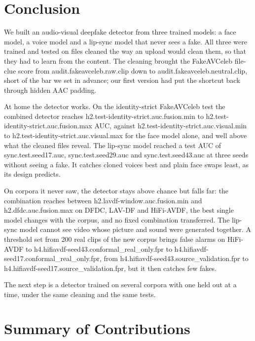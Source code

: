 \section{Conclusion}

We built an audio-visual deepfake detector from three trained models: a face
model, a voice model and a lip-sync model that never sees a fake. All three
were trained and tested on files cleaned the way an upload would clean them,
so that they had to learn from the content. The cleaning brought the
FakeAVCeleb file-clue score from {{audit.fakeavceleb.raw.clip}} down to
{{audit.fakeavceleb.neutral.clip}}, short of the bar we set in advance; our
first version had put the shortcut back through hidden AAC padding.

At home the detector works. On the identity-strict FakeAVCeleb test the
combined detector reaches {{h2.test-identity-strict.auc.fusion.min}} to
{{h2.test-identity-strict.auc.fusion.max}} AUC, against
{{h2.test-identity-strict.auc.visual.min}} to
{{h2.test-identity-strict.auc.visual.max}} for the face model alone, and well
above what the cleaned files reveal. The lip-sync model reached a test AUC of
{{sync.test.seed17.auc}}, {{sync.test.seed29.auc}} and
{{sync.test.seed43.auc}} at three seeds without seeing a fake. It catches
cloned voices best and plain face swaps least, as its design predicts.

On corpora it never saw, the detector stays above chance but falls far: the
combination reaches between {{h2.lavdf-window.auc.fusion.min}} and
{{h2.dfdc.auc.fusion.max}} on DFDC, LAV-DF and HiFi-AVDF, the best single model
changes with the corpus, and no fixed combination transferred. The lip-sync
model cannot see video whose picture and sound were generated together. A
threshold set from 200 real clips of the new corpus brings false alarms on
HiFi-AVDF to {{h4.hifiavdf-seed43.conformal_real_only.fpr}} to
{{h4.hifiavdf-seed17.conformal_real_only.fpr}}, from
{{h4.hifiavdf-seed43.source_validation.fpr}} to
{{h4.hifiavdf-seed17.source_validation.fpr}}, but it then catches few fakes.

The next step is a detector trained on several corpora with one held out at a
time, under the same cleaning and the same tests.

\section{Summary of Contributions}

